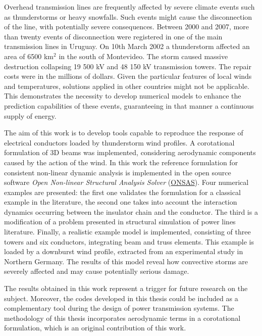 \begin{foreignabstract}
Overhead transmission lines are frequently affected by severe climate events such as thunderstorms or heavy snowfalls. Such events might cause the disconnection of the line, with potentially severe consequences. Between 2000 and 2007, more than twenty events of disconnection were registered in one of the main transmission lines in Uruguay. On 10th March 2002 a thunderstorm affected an area of 6500 km$^2$ in the south of Montevideo. The storm caused massive destruction collapsing 19 500 kV and 48 150 kV transmission towers. The repair costs were in the millions of dollars. Given the particular features of local winds and temperatures, solutions applied in other countries might not be applicable. This demonstrates the necessity to develop numerical models to enhance the prediction capabilities of these events, guaranteeing in that manner a continuous supply of energy.

The aim of this work is to develop tools capable to reproduce the response of electrical conductors loaded by  thunderstorm wind profiles. A corotational formulation of 3D beams was implemented, considering aerodynamic components caused by the action of the wind. In this work the reference formulation for consistent non-linear dynamic analysis is implemented in the open source software \emph{Open Non-linear Structural Analysis Solver} (\href{https://github.com/ONSAS/ONSAS.m/}{ONSAS}). Four numerical examples are presented: the first one validates the formulation for a classical example in the literature, the second one takes into account the interaction dynamics occurring between the insulator chain and the conductor. The third is a modification of a problem presented in structural simulation of power lines literature.  Finally, a realistic example model is implemented, consisting of three towers and six conductors, integrating beam and truss elements. This example is loaded by a downburst wind profile,  extracted from an experimental study in Northern Germany. The results of this model reveal how convective storms are severely affected and may cause potentially serious damage.

The results obtained in this work represent a trigger for future research on the subject. Moreover, the codes developed in this thesis could be included as a complementary tool during the design of power transmission systems. The methodology of this thesis incorporates aerodynamic terms in a corotational formulation, which is an original contribution of this work.  

\end{foreignabstract}